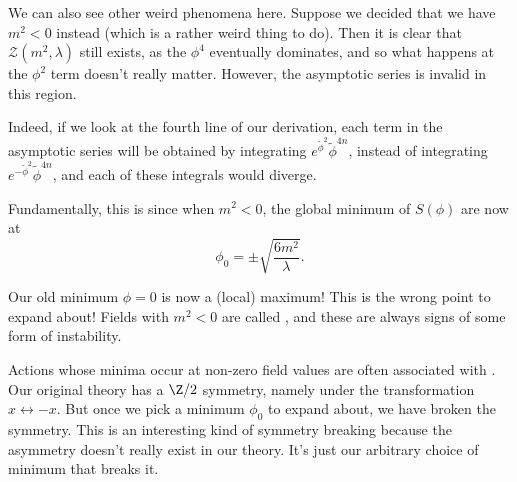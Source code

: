 \documentclass[a4paper]{article}
\begin{document}
We can also see other weird phenomena here. Suppose we decided that we have $m^2 < 0$ instead (which is a rather weird thing to do). Then it is clear that $\mathcal{Z}(m^2, \lambda)$ still exists, as the $\phi^4$ eventually dominates, and so what happens at the $\phi^2$ term doesn't really matter. However, the asymptotic series is invalid in this region.

Indeed, if we look at the fourth line of our derivation, each term in the asymptotic series will be obtained by integrating $e^{\tilde\phi^2} \tilde\phi^{4n}$, instead of integrating $e^{-\tilde\phi^2} \tilde\phi^{4n}$, and each of these integrals would diverge.

Fundamentally, this is since when $m^2 < 0$, the global minimum of $S(\phi)$ are now at
\[
  \phi_0 = \pm \sqrt{\frac{6m^2}{\lambda}}.
\]
\begin{center}
\end{center}
Our old minimum $\phi = 0$ is now a (local) maximum! This is the wrong point to expand about! Fields with $m^2 < 0$ are called , and these are always signs of some form of instability.

Actions whose minima occur at non-zero field values are often associated with . Our original theory has a $\Z/2$ symmetry, namely under the transformation $x \leftrightarrow -x$. But once we pick a minimum $\phi_0$ to expand about, we have broken the symmetry. This is an interesting kind of symmetry breaking because the asymmetry doesn't really exist in our theory. It's just our arbitrary choice of minimum that breaks it.
\end{document}

